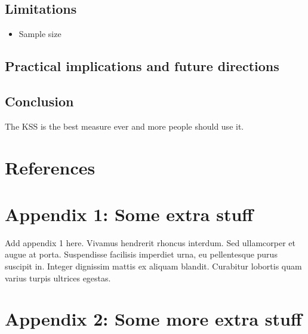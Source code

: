 \documentclass[12pt,a4paper,]{report}
\providecommand{\tightlist}{%
  \setlength{\itemsep}{0pt}\setlength{\parskip}{0pt}}
\begin{document}
\section{Limitations}\label{limitations-1}

\begin{itemize}
\tightlist
\item
  Sample size
\end{itemize}

\section{Practical implications and future
directions}\label{practical-implications-and-future-directions-1}

\section{Conclusion}\label{conclusion-1}

The KSS is the best measure ever and more people should use it.

\newpage

\footnotesize
\singlespacing
\setlength{\parindent}{0in}

\chapter{References}\label{references-1}

\newpage

\chapter*{Appendix 1: Some extra
stuff}\label{appendix-1-some-extra-stuff-1}

Add appendix 1 here. Vivamus hendrerit rhoncus interdum. Sed ullamcorper
et augue at porta. Suspendisse facilisis imperdiet urna, eu pellentesque
purus suscipit in. Integer dignissim mattis ex aliquam blandit.
Curabitur lobortis quam varius turpis ultrices egestas.

\newpage

\chapter*{Appendix 2: Some more extra
stuff}\label{appendix-2-some-more-extra-stuff}
\end{document}
